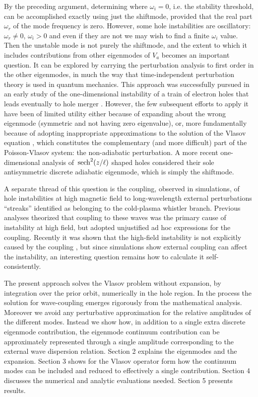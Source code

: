 \documentclass{jpp}
\def\sech{{\,\rm sech}}
\begin{document}
By the preceding argument, determining where $\omega_i=0$, i.e. the
stability threshold, can be accomplished exactly using just the
shiftmode, provided that the real part $\omega_r$ of the mode
frequency is zero. However, some hole instabilities are oscillatory:
$\omega_r\not=0$, $\omega_i>0$ and even if they are not we may wish to
find a finite $\omega_i$ value. Then the unstable mode is not purely
the shiftmode, and the extent to which it includes contributions from
other eigenmodes of $V_a$ becomes an important question. It can be
explored by carrying the perturbation analysis to first order in the
other eigenmodes, in much the way that time-independent perturbation
theory is used in quantum mechanics. This approach was successfully
pursued in an early study of the one-dimensional instability of a
train of electron holes that leads eventually to hole merger
\citep{Schwarzmeier1979}. However, the few subsequent efforts to apply
it \citep{Schamel1982,Schamel1987,Collantes1988} have been of limited
utility either because of expanding about the wrong eigenmode
(symmetric and not having zero eigenvalue), or, more fundamentally
because of adopting inappropriate approximations to the solution of
the Vlasov equation \citep{Jovanovic2002}, which constitutes the
complementary (and more difficult) part of the Poisson-Vlasov system:
the non-adiabatic perturbation. A more recent one-dimensional analysis
\citep{Dokgo2016} of $\sech^2(z/\ell)$ shaped holes considered their
sole antisymmetric discrete adiabatic eigenmode, which is simply the
shiftmode.

A separate thread of this question is the coupling, observed in
simulations\citep{Oppenheim1999,Oppenheim2001b,Lu2008}, of hole
instabilities at high magnetic field to long-wavelength external
perturbations ``streaks'' identified as belonging to the cold-plasma
whistler branch. Previous analyses
\citep{Newman2001a,Vetoulis2001,Berthomier2002} theorized that
coupling to these waves was the primary cause of instability at high
field, but adopted unjustified ad hoc expressions for the
coupling. Recently it was shown that the high-field instability is not
explicitly caused by the coupling \citep{Hutchinson2019a}, but since
simulations show external coupling can affect the instability, an
interesting question remains how to calculate it self-consistently.


The present approach solves the Vlasov problem without expansion, by
integration over the prior orbit, numerically in the hole region.  In
the process the solution for wave-coupling emerges rigorously from the
mathematical analysis. Moreover we avoid any perturbative
approximation for the relative amplitudes of the different modes.
Instead we show how, in addition to a single extra discrete eigenmode
contribution, the eigenmode continuum contribution can be
approximately represented through a single amplitude corresponding to
the external wave dispersion relation.  Section 2 explains the
eigenmodes and the expansion. Section 3 shows for the Vlasov operator
form how the continuum modes can be included and reduced to
effectively a single contribution. Section 4 discusses the numerical
and analytic evaluations needed. Section 5 presents results.
\end{document}
